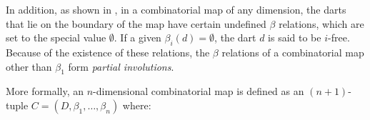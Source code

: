 In addition, as shown in , in a combinatorial map of any dimension, the darts that lie on the boundary of the map have certain undefined $\beta$ relations, which are set to the special value $\emptyset$.
If a given $\beta_i(d) = \emptyset$, the dart $d$ is said to be $i$-free.
Because of the existence of these relations, the $\beta$ relations of a combinatorial map other than $\beta_1$ form \emph{partial involutions}.

More formally, an $n$-dimensional combinatorial map is defined as an $(n+1)$-tuple $C = (D, \beta_{1}, \ldots, \beta_{n})$ where:

